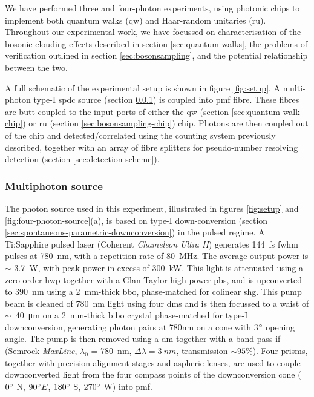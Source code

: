 We have performed three and four-photon experiments, using photonic chips to implement both quantum walks (\acrshort{qw}) and Haar-random \bosonsampling unitaries (\acrshort{ru}). Throughout our experimental work, we have focussed on characterisation of the bosonic clouding effects described in section \ref{sec:quantum-walks}, the problems of \bosonsampling verification outlined in section \ref{sec:bosonsampling}, and the potential relationship between the two.

A full schematic of the experimental setup is shown in figure \ref{fig:setup}. A multi-photon type-I \gls{spdc} source (section \ref{sec:four-photon-source}) is coupled into \gls{pmf} fibre. These fibres are butt-coupled to the input ports of either the \gls{qw} (section \ref{sec:quantum-walk-chip}) or \gls{ru} (section \ref{sec:bosonsampling-chip}) chip. Photons are then coupled out of the chip and detected/correlated using the counting system previously described, together with an array of fibre splitters for pseudo-number resolving detection (section \ref{sec:detection-scheme}).

\subsubsection{Multiphoton source} 
\label{sec:four-photon-source}
The photon source used in this experiment, illustrated in figures \ref{fig:setup} and \ref{fig:four-photon-source}(a), is based on type-I down-conversion (section \ref{sec:spontaneous-parametric-downconversion}) in the pulsed regime.
A Ti:Sapphire pulsed laser (Coherent \emph{Chameleon Ultra II}) generates \SI{144}{fs} \gls{fwhm} pulses at \SI{780}{nm}, with a repetition rate of \SI{80}{MHz}. The average output power is $\sim$ \SI{3.7}{W}, with peak power in excess of \SI{300}{kW}. This light is attenuated using a zero-order \gls{hwp} together with a Glan Taylor high-power \gls{pbs}, and is upconverted to \SI{390}{nm} using a \SI{2}{mm}-thick \gls{bbo}, phase-matched for colinear \gls{shg}. This pump beam is cleaned of \SI{780}{nm} light using four \glspl{dm} and is then focussed to a waist of $\sim$~\SI{40}{\micro \metre} on a \SI{2}{mm}-thick \gls{bibo} crystal phase-matched for type-I downconversion, generating photon pairs at 780nm on a cone with 3$^{\circ}$ opening angle. The pump is then removed using a \gls{dm} together with a band-pass \gls{if} (Semrock \emph{MaxLine}, $\lambda_0$ = \SI{780}{nm}, $\Delta \lambda = \SI{3}{nm}$, transmission $\sim 95\%$).  Four prisms, together with precision alignment stages and aspheric lenses, are used to couple downconverted light from the four compass points of the downconversion cone ($0 ^{\circ}$ N, $90 ^{\circ} E$, $180 ^{\circ}$ S, $270 ^{\circ}$ W) into \gls{pmf}.

